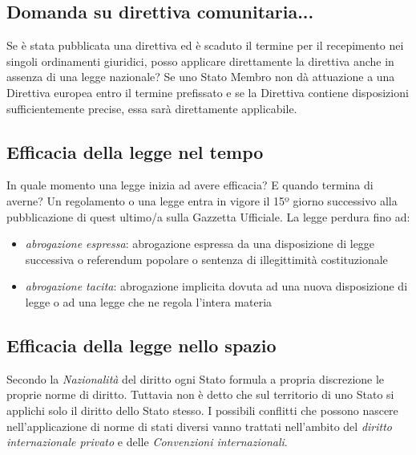 \subsection{Domanda su direttiva comunitaria...}
Se è stata pubblicata una direttiva ed è scaduto il termine per il recepimento nei singoli ordinamenti giuridici,
posso applicare direttamente la direttiva anche in assenza di una legge nazionale? \newline
Se uno Stato Membro non dà attuazione a una Direttiva europea entro il termine prefissato e se la Direttiva contiene
disposizioni sufficientemente precise, essa sarà direttamente applicabile.

\subsection{Efficacia della legge nel tempo}
In quale momento una legge inizia ad avere efficacia? E quando termina di averne? \newline
Un regolamento o una legge entra in vigore il 15º giorno successivo alla pubblicazione di quest ultimo/a sulla Gazzetta Ufficiale. \newline
La legge perdura fino ad:
\begin{itemize}
    \item\emph{abrogazione espressa}: abrogazione espressa da una disposizione di legge successiva o referendum popolare o sentenza
    di illegittimità costituzionale 
    \item\emph{abrogazione tacita}: abrogazione implicita dovuta ad una nuova disposizione di legge o ad una legge che ne regola 
    l'intera materia
\end{itemize}

\subsection{Efficacia della legge nello spazio}
Secondo la \emph{Nazionalità} del diritto ogni Stato formula a propria discrezione le proprie norme
di diritto. Tuttavia non è detto che sul territorio di uno Stato si applichi solo il diritto dello Stato stesso. \newline
I possibili conflitti che possono nascere nell'applicazione di norme di stati diversi vanno trattati 
nell'ambito del \emph{diritto internazionale privato} e delle \emph{Convenzioni internazionali}.

